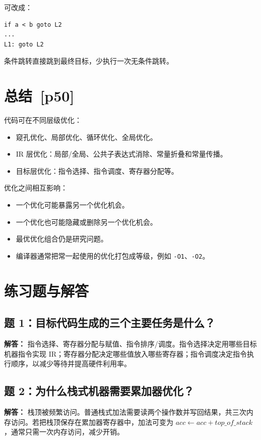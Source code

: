 \documentclass[UTF8,fontset=none,11pt]{ctexart}
\newcommand{\pg}[1]{\texorpdfstring{{\small\color{graytext}\,[p#1]}}{ [p#1]}}
\begin{document}
可改成：

\begin{verbatim}
if a < b goto L2
...
L1: goto L2
\end{verbatim}

条件跳转直接跳到最终目标，少执行一次无条件跳转。

\section{总结 \pg{50}}

代码可在不同层级优化：

\begin{itemize}
  \item 窥孔优化、局部优化、循环优化、全局优化。
  \item IR 层优化：局部/全局、公共子表达式消除、常量折叠和常量传播。
  \item 目标层优化：指令选择、指令调度、寄存器分配等。
\end{itemize}

优化之间相互影响：

\begin{itemize}
  \item 一个优化可能暴露另一个优化机会。
  \item 一个优化也可能隐藏或删除另一个优化机会。
  \item 最优优化组合仍是研究问题。
  \item 编译器通常把常一起使用的优化打包成等级，例如 \texttt{-O1}、\texttt{-O2}。
\end{itemize}

\section{练习题与解答}

\subsection*{题 1：目标代码生成的三个主要任务是什么？}

\textbf{解答：} 指令选择、寄存器分配与赋值、指令排序/调度。指令选择决定用哪些目标机器指令实现 IR；寄存器分配决定哪些值放入哪些寄存器；指令调度决定指令执行顺序，以减少等待并提高硬件利用率。

\subsection*{题 2：为什么栈式机器需要累加器优化？}

\textbf{解答：} 栈顶被频繁访问。普通栈式加法需要读两个操作数并写回结果，共三次内存访问。若把栈顶保存在累加器寄存器中，加法可变为 \(acc\leftarrow acc+top\_of\_stack\)，通常只需一次内存访问，减少开销。
\end{document}
